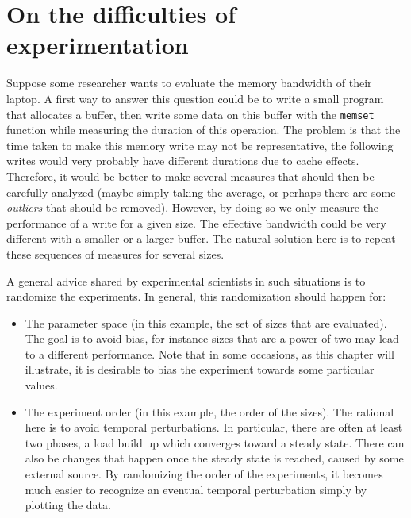 \chapter{On the difficulties of experimentation}%
\label{chapter:experiment:difficulties}
    Suppose some researcher wants to evaluate the memory bandwidth of their laptop. A first way to answer this question
    could be to write a small program that allocates a buffer, then write some data on this buffer with the
    \texttt{memset} function while measuring the duration of this operation. The problem is that the time taken to make
    this memory write may not be representative, the following writes would very probably have different durations due
    to cache effects.  Therefore, it would be better to make several measures that should then be carefully analyzed
    (maybe simply taking the average, or perhaps there are some \emph{outliers} that should be removed). However, by
    doing so we only measure the performance of a write for a given size. The effective bandwidth could be very
    different with a smaller or a larger buffer. The natural solution here is to repeat these sequences of measures for
    several sizes.

    A general advice shared by experimental scientists in such situations is to randomize the experiments. In general,
    this randomization should happen for:
    \begin{itemize}
        \item The parameter space (in this example, the set of sizes that are evaluated). The goal is to avoid bias, for
            instance sizes that are a power of two may lead to a different performance. Note that in some occasions, as
            this chapter will illustrate, it is desirable to bias the experiment towards some particular values.
        \item The experiment order (in this example, the order of the sizes). The rational here is to avoid temporal
            perturbations. In particular, there are often at least two phases, a load build up which converges toward a
            steady state. There can also be changes that happen once the steady state is reached, \eg caused by some
            external source. By randomizing the order of the experiments, it becomes much easier to recognize an
            eventual temporal perturbation simply by plotting the data.
    \end{itemize}

